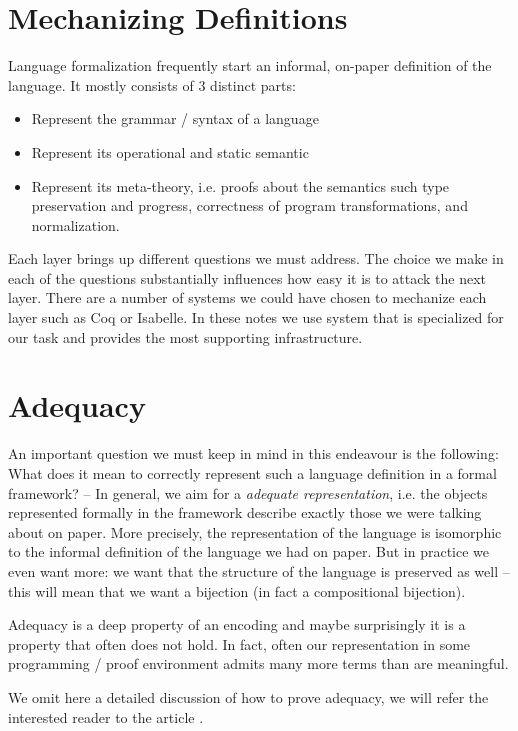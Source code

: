 \section{Mechanizing Definitions} Language formalization frequently
start an informal, on-paper definition of the language. It mostly
consists of 3 distinct parts: 

\begin{itemize}
\item Represent the grammar / syntax of a language
\item Represent its operational and static semantic
\item Represent its meta-theory, i.e. proofs about the semantics such
  type preservation and progress, correctness of program transformations, and normalization.
\end{itemize}

Each layer brings up different questions we must address. The choice
we make in each of the questions substantially influences how easy it
is to attack the next layer.  There are a number of systems we could have chosen to mechanize each layer such as Coq or Isabelle. In these notes we use system that is specialized for our task and provides the most supporting infrastructure. 
 

\section{Adequacy} An important question we must keep in mind in
this endeavour is the following: 
What does it mean to correctly represent such a language
definition in a formal framework? -- In general, we aim for a
\emph{adequate representation}, i.e. the objects represented formally
in the framework describe exactly those we were talking about on
paper. More precisely, the representation of the language is
isomorphic to the informal definition of the language we had on
paper. But in practice we even want more: we want that the structure
of the language is preserved as well -- this will mean that we want a
bijection (in fact a compositional bijection).


Adequacy is a deep property of an encoding and maybe surprisingly it
is a property that often does not hold. In fact, often our
representation in some programming / proof environment admits many
more terms than are meaningful. 

We omit here a detailed discussion of how to prove adequacy, we
will refer the interested reader to the article
\citep{HarperLicata:JFP07}. 